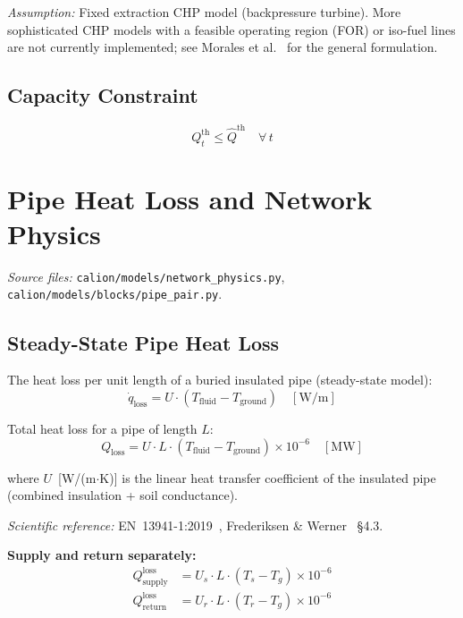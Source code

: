 \documentclass[a4paper,12pt]{article}
\begin{document}
\noindent\textit{Assumption:} Fixed extraction CHP model (backpressure turbine). More
sophisticated CHP models with a feasible operating region (FOR) or iso-fuel lines are not
currently implemented; see Morales et al.~\cite{Morales2014} for the general formulation.

\subsection{Capacity Constraint}

\begin{equation}
  Q^{\text{th}}_{t} \leq \hat{Q}^{\text{th}}
  \quad \forall\, t
  \tag{GEN-4}
  \label{eq:gen4}
\end{equation}

\section{Pipe Heat Loss and Network Physics}
\label{sec:pipe}

\textit{Source files:} \texttt{calion/models/network\_physics.py},
\texttt{calion/models/blocks/pipe\_pair.py}.

\subsection{Steady-State Pipe Heat Loss}

The heat loss per unit length of a buried insulated pipe (steady-state model):
\[
  \dot{q}_{\text{loss}} = U \cdot (T_{\text{fluid}} - T_{\text{ground}}) \quad [\text{W/m}]
\]

Total heat loss for a pipe of length $L$:
\begin{equation}
  Q_{\text{loss}}
  = U \cdot L \cdot (T_{\text{fluid}} - T_{\text{ground}}) \times 10^{-6}
  \quad [\text{MW}]
  \tag{PH-1}
  \label{eq:ph1}
\end{equation}

where $U$~[W/(m$\cdot$K)] is the linear heat transfer coefficient of the insulated pipe
(combined insulation + soil conductance).

\noindent\textit{Scientific reference:} EN~13941-1:2019~\cite{EN13941}, Frederiksen \&
Werner~\cite{Frederiksen2013} \S4.3.

\noindent\textbf{Supply and return separately:}
\begin{align*}
  Q^{\text{loss}}_{\text{supply}}
    &= U_s \cdot L \cdot (T_s - T_g) \times 10^{-6} \\
  Q^{\text{loss}}_{\text{return}}
    &= U_r \cdot L \cdot (T_r - T_g) \times 10^{-6}
\end{align*}
\end{document}
